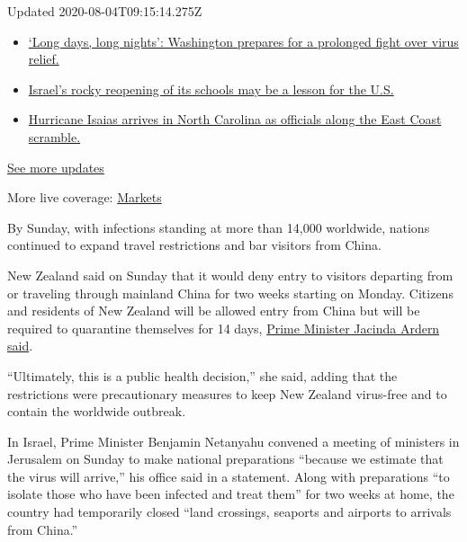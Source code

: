 Updated 2020-08-04T09:15:14.275Z

\begin{itemize}
\tightlist
\item
  \href{https://www.nytimes.com/2020/08/04/world/coronavirus-covid-19.html?action=click\&pgtype=Article\&state=default\&region=MAIN_CONTENT_1\&context=storylines_live_updates\#link-6b644638}{`Long
  days, long nights': Washington prepares for a prolonged fight over
  virus relief.}
\item
  \href{https://www.nytimes.com/2020/08/04/world/coronavirus-covid-19.html?action=click\&pgtype=Article\&state=default\&region=MAIN_CONTENT_1\&context=storylines_live_updates\#link-7af9fca0}{Israel's
  rocky reopening of its schools may be a lesson for the U.S.}
\item
  \href{https://www.nytimes.com/2020/08/04/world/coronavirus-covid-19.html?action=click\&pgtype=Article\&state=default\&region=MAIN_CONTENT_1\&context=storylines_live_updates\#link-33bf9168}{Hurricane
  Isaias arrives in North Carolina as officials along the East Coast
  scramble.}
\end{itemize}

\href{https://www.nytimes.com/2020/08/04/world/coronavirus-covid-19.html?action=click\&pgtype=Article\&state=default\&region=MAIN_CONTENT_1\&context=storylines_live_updates}{See
more updates}

More live coverage:
\href{https://www.nytimes.com/live/2020/08/03/business/stock-market-today-coronavirus?action=click\&pgtype=Article\&state=default\&region=MAIN_CONTENT_1\&context=storylines_live_updates}{Markets}

By Sunday, with infections standing at more than 14,000 worldwide,
nations continued to expand travel restrictions and bar visitors from
China.

New Zealand said on Sunday that it would deny entry to visitors
departing from or traveling through mainland China for two weeks
starting on Monday. Citizens and residents of New Zealand will be
allowed entry from China but will be required to quarantine themselves
for 14 days,
\href{https://www.tvnz.co.nz/one-news/new-zealand/new-zealand-restrict-travellers-china-coronavirus-spreads-worldwide}{Prime
Minister Jacinda Ardern said}.

``Ultimately, this is a public health decision,'' she said, adding that
the restrictions were precautionary measures to keep New Zealand
virus-free and to contain the worldwide outbreak.

In Israel, Prime Minister Benjamin Netanyahu convened a meeting of
ministers in Jerusalem on Sunday to make national preparations ``because
we estimate that the virus will arrive,'' his office said in a
statement. Along with preparations ``to isolate those who have been
infected and treat them'' for two weeks at home, the country had
temporarily closed ``land crossings, seaports and airports to arrivals
from China.''

